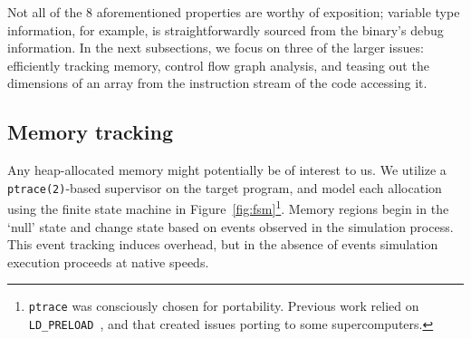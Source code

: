 Not all of the $8$ aforementioned properties are worthy of exposition;
variable type information, for example, is straightforwardly sourced
from the binary's debug information.  In the next subsections, we focus
on three of the larger issues: efficiently tracking memory, control
flow graph analysis, and teasing out the dimensions of an array from
the instruction stream of the code accessing it.

\subsection{Memory tracking}

Any heap-allocated memory might potentially be of interest to us.  We
utilize a
\texttt{ptrace(2)}-based supervisor on the target program, and model
each allocation using the finite state machine in
Figure~\ref{fig:fsm}\footnote{\texttt{ptrace} was
consciously chosen for portability.  Previous work relied on
\texttt{LD\_PRELOAD}~\cite{Fogal:2014:Freeprocessing}, and that created
issues porting to some supercomputers.}.  Memory regions begin in
the `null' state and change state based on events observed in the
simulation process.  This event tracking induces overhead, but in the
absence of events simulation execution proceeds at native speeds.



